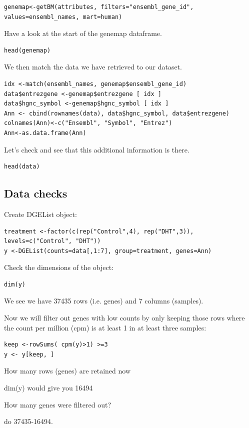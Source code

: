 \begin{steps}
\begin{steps}
\begin{lstlisting}
genemap<-getBM(attributes, filters="ensembl_gene_id", values=ensembl_names, mart=human)
\end{lstlisting}Have a look at the start of the genemap dataframe.

\begin{lstlisting}
head(genemap)
\end{lstlisting}We then match the data we have retrieved to our dataset.

\begin{lstlisting}
idx <-match(ensembl_names, genemap$ensembl_gene_id)
data$entrezgene <-genemap$entrezgene [ idx ]
data$hgnc_symbol <-genemap$hgnc_symbol [ idx ]
Ann <- cbind(rownames(data), data$hgnc_symbol, data$entrezgene)
colnames(Ann)<-c("Ensembl", "Symbol", "Entrez")
Ann<-as.data.frame(Ann)
\end{lstlisting}Let’s check and see that this additional information is there.
\begin{lstlisting}
head(data)
\end{lstlisting}
\end{steps}

\subsection{Data checks}
Create DGEList object:
\begin{lstlisting}
treatment <-factor(c(rep("Control",4), rep("DHT",3)), levels=c("Control", "DHT"))
y <-DGEList(counts=data[,1:7], group=treatment, genes=Ann)
\end{lstlisting}



Check the dimensions of the object:
\begin{lstlisting}
dim(y)
\end{lstlisting}

We see we have 37435 rows (i.e. genes) and 7 columns (samples).

Now we will filter out genes with low counts by only keeping those rows where the count
per million (cpm) is at least 1 in at least three samples:
\begin{lstlisting}
keep <-rowSums( cpm(y)>1) >=3
y <- y[keep, ]
\end{lstlisting}

\end{steps}

\begin{questions}
How many rows (genes) are retained now
\begin{answer}
dim(y) would give you 16494
\end{answer}

How many genes were filtered out?
\begin{answer}
do 37435-16494.
\end{answer}
\end{questions}


